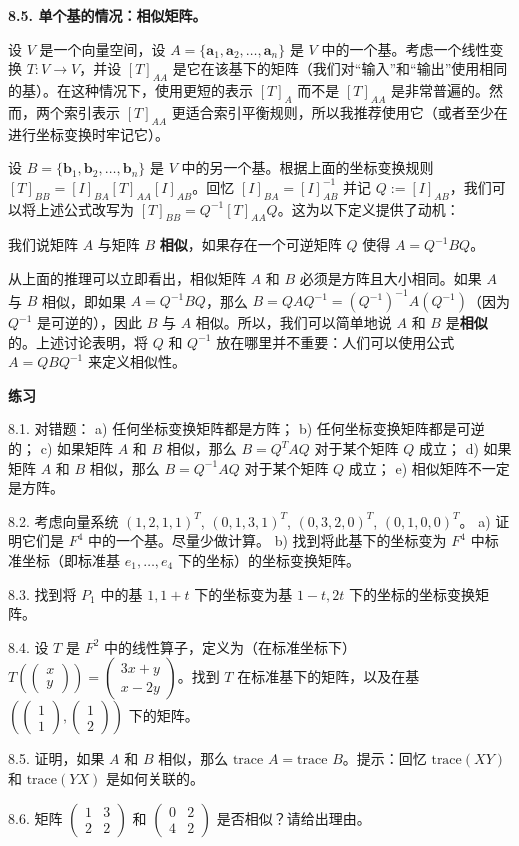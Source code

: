 \textbf{8.5. 单个基的情况：相似矩阵。}

设 $V$ 是一个向量空间，设 $A = \{\mathbf{a}_1, \mathbf{a}_2, \dots, \mathbf{a}_n\}$ 是 $V$ 中的一个基。考虑一个线性变换 $T: V \to V$，并设 $[T]_{AA}$ 是它在该基下的矩阵（我们对“输入”和“输出”使用相同的基）。在这种情况下，使用更短的表示 $[T]_A$ 而不是 $[T]_{AA}$ 是非常普遍的。然而，两个索引表示 $[T]_{AA}$ 更适合索引平衡规则，所以我推荐使用它（或者至少在进行坐标变换时牢记它）。

设 $B = \{\mathbf{b}_1, \mathbf{b}_2, \dots, \mathbf{b}_n\}$ 是 $V$ 中的另一个基。根据上面的坐标变换规则 $[T]_{BB} = [I]_{BA} [T]_{AA} [I]_{AB}$。回忆 $[I]_{BA} = [I]_{AB}^{-1}$ 并记 $Q := [I]_{AB}$，我们可以将上述公式改写为 $[T]_{BB} = Q^{-1} [T]_{AA} Q$。这为以下定义提供了动机：

\begin{definition} 我们说矩阵 $A$ 与矩阵 $B$ \textbf{相似}，如果存在一个可逆矩阵 $Q$ 使得 $A = Q^{-1} BQ$。
\end{definition}

从上面的推理可以立即看出，相似矩阵 $A$ 和 $B$ 必须是方阵且大小相同。如果 $A$ 与 $B$ 相似，即如果 $A = Q^{-1} BQ$，那么 $B = Q A Q^{-1} = (Q^{-1})^{-1} A (Q^{-1})$（因为 $Q^{-1}$ 是可逆的），因此 $B$ 与 $A$ 相似。所以，我们可以简单地说 $A$ 和 $B$ 是\textbf{相似}的。上述讨论表明，将 $Q$ 和 $Q^{-1}$ 放在哪里并不重要：人们可以使用公式 $A = QBQ^{-1}$ 来定义相似性。

\textbf{练习}~

8.1. 对错题：
a) 任何坐标变换矩阵都是方阵；
b) 任何坐标变换矩阵都是可逆的；
c) 如果矩阵 $A$ 和 $B$ 相似，那么 $B = Q^T A Q$ 对于某个矩阵 $Q$ 成立；
d) 如果矩阵 $A$ 和 $B$ 相似，那么 $B = Q^{-1} A Q$ 对于某个矩阵 $Q$ 成立；
e) 相似矩阵不一定是方阵。

8.2. 考虑向量系统 $(1, 2, 1, 1)^T$, $(0, 1, 3, 1)^T$, $(0, 3, 2, 0)^T$, $(0, 1, 0, 0)^T$。
a) 证明它们是 $F^4$ 中的一个基。尽量少做计算。
b) 找到将此基下的坐标变为 $F^4$ 中标准坐标（即标准基 $e_1, \dots, e_4$ 下的坐标）的坐标变换矩阵。

8.3. 找到将 $P_1$ 中的基 $1, 1+t$ 下的坐标变为基 $1-t, 2t$ 下的坐标的坐标变换矩阵。

8.4. 设 $T$ 是 $F^2$ 中的线性算子，定义为（在标准坐标下）$T(\begin{pmatrix} x \\ y \end{pmatrix}) = \begin{pmatrix} 3x + y \\ x - 2y \end{pmatrix}$。找到 $T$ 在标准基下的矩阵，以及在基 $(\begin{pmatrix} 1 \\ 1 \end{pmatrix}, \begin{pmatrix} 1 \\ 2 \end{pmatrix})$ 下的矩阵。

8.5. 证明，如果 $A$ 和 $B$ 相似，那么 $\text{trace } A = \text{trace } B$。提示：回忆 $\text{trace}(XY)$ 和 $\text{trace}(YX)$ 是如何关联的。

8.6. 矩阵 $\begin{pmatrix} 1 & 3 \\ 2 & 2 \end{pmatrix}$ 和 $\begin{pmatrix} 0 & 2 \\ 4 & 2 \end{pmatrix}$ 是否相似？请给出理由。

